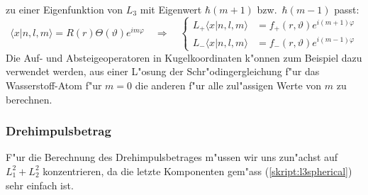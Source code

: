 zu einer Eigenfunktion von $L_3$ mit Eigenwert $\hbar(m+1)$ bzw.~$\hbar(m-1)$
passt:
\begin{equation*}
\langle x|n,l,m\rangle
=
R(r)\Theta(\vartheta)e^{im\varphi}
\quad\Rightarrow\quad
\left\{
\begin{aligned}
L_+
\langle x|n,l,m\rangle
&=
f_+(r,\vartheta)
e^{i(m+1)\varphi}
\\
L_-
\langle x|n,l,m\rangle
&=
f_-(r,\vartheta)
e^{i(m-1)\varphi}
\end{aligned}
\right.
\end{equation*}
Die Auf- und Absteigeoperatoren in Kugelkoordinaten k"onnen zum
Beispiel dazu verwendet werden, aus einer L"osung der Schr"odingergleichung
f"ur das Wasserstoff-Atom f"ur $m=0$ die anderen f"ur alle zul"assigen
Werte von $m$ zu berechnen.

\subsubsection{Drehimpulsbetrag}
F"ur die Berechnung des Drehimpulsbetrages m"ussen wir uns zun"achst
auf $L_1^2+L_2^2$ konzentrieren, da die letzte Komponenten gem"ass
(\ref{skript:l3spherical}) sehr einfach ist.
